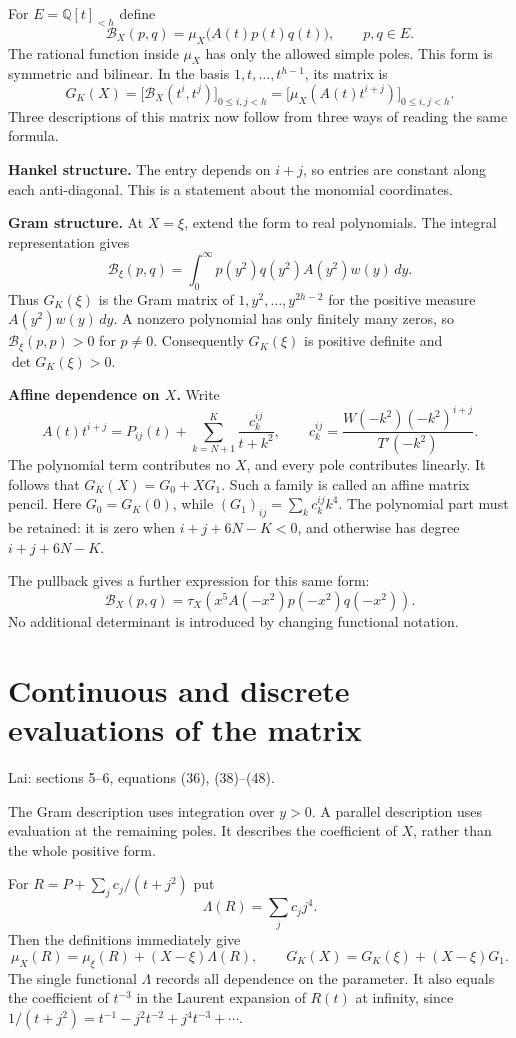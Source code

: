 \documentclass[11pt]{article}
\newcommand{\Q}{\mathbb Q}
\newcommand{\dd}{\,d}
\newcommand{\Bcal}{\mathcal B}
\newcommand{\source}[1]{{\small\color{blue!45!black}Lai: #1.}\par}
\newcommand{\pagetitle}[2]{\section*{#1}\source{#2}}
\begin{document}
For $E=\Q[t]_{<h}$ define
\[
 \Bcal_X(p,q)=\mu_X\bigl(A(t)p(t)q(t)\bigr),\qquad p,q\in E.
\]
The rational function inside $\mu_X$ has only the allowed simple poles.
This form is symmetric and bilinear. In the basis $1,t,\ldots,t^{h-1}$,
its matrix is
\[
 G_K(X)=\bigl[\Bcal_X(t^i,t^j)\bigr]_{0\leq i,j<h}
       =\bigl[\mu_X(A(t)t^{i+j})\bigr]_{0\leq i,j<h}.
\]
Three descriptions of this matrix now follow from three ways of reading
the same formula.

\textbf{Hankel structure.} The entry depends on $i+j$, so entries are constant
along each anti-diagonal. This is a statement about the monomial coordinates.

\textbf{Gram structure.} At $X=\xi$, extend the form to real polynomials.
The integral representation gives
\[
 \Bcal_\xi(p,q)=\int_0^\infty p(y^2)q(y^2)A(y^2)w(y)\dd y.
\]
Thus $G_K(\xi)$ is the Gram matrix of $1,y^2,\ldots,y^{2h-2}$ for the
positive measure $A(y^2)w(y)\dd y$. A nonzero polynomial has only finitely
many zeros, so $\Bcal_\xi(p,p)>0$ for $p\ne0$. Consequently
$G_K(\xi)$ is positive definite and $\det G_K(\xi)>0$.

\textbf{Affine dependence on $X$.} Write
\[
 A(t)t^{i+j}=P_{ij}(t)+\sum_{k=N+1}^K\frac{c_k^{ij}}{t+k^2},
 \qquad
 c_k^{ij}=\frac{W(-k^2)(-k^2)^{i+j}}{T'(-k^2)}.
\]
The polynomial term contributes no $X$, and every pole contributes linearly.
It follows that $G_K(X)=G_0+XG_1$. Such a family is called an affine matrix
pencil. Here $G_0=G_K(0)$, while $(G_1)_{ij}=\sum_k c_k^{ij}k^4$.
The polynomial part must be retained: it is zero when $i+j+6N-K<0$,
and otherwise has degree $i+j+6N-K$.

The pullback gives a further expression for this same form:
\[
 \Bcal_X(p,q)=\tau_X\!\left(x^5 A(-x^2)p(-x^2)q(-x^2)\right).
\]
No additional determinant is introduced by changing functional notation.

\newpage
\pagetitle{Continuous and discrete evaluations of the matrix}
{sections 5--6, equations (36), (38)--(48)}
The Gram description uses integration over $y>0$. A parallel description
uses evaluation at the remaining poles. It describes the coefficient of
$X$, rather than the whole positive form.

For $R=P+\sum_j c_j/(t+j^2)$ put
\[
 \Lambda(R)=\sum_j c_jj^4.
\]
Then the definitions immediately give
\[
 \mu_X(R)=\mu_\xi(R)+(X-\xi)\Lambda(R),\qquad
 G_K(X)=G_K(\xi)+(X-\xi)G_1.
\]
The single functional $\Lambda$ records all dependence on the parameter.
It also equals the coefficient of $t^{-3}$ in the Laurent expansion of
$R(t)$ at infinity, since
$1/(t+j^2)=t^{-1}-j^2t^{-2}+j^4t^{-3}+\cdots$.
\end{document}
